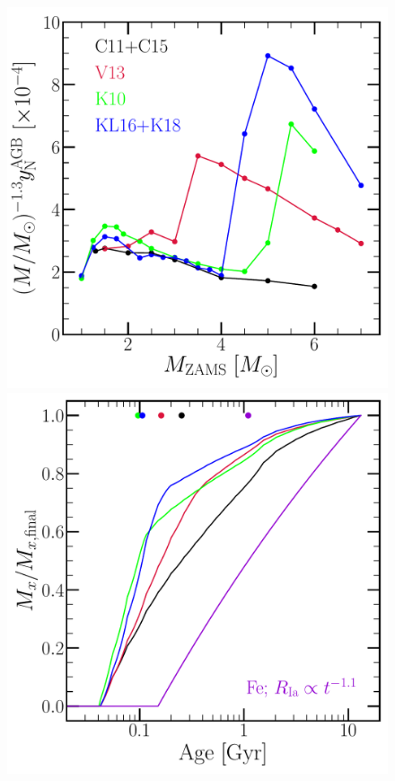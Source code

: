\documentclass[ms.tex]{subfiles}
\begin{document}
\begin{figure} 
\centering 
\includegraphics[scale = 0.3]{agb_yield_models_imfweighted.pdf} 
\includegraphics[scale = 0.3]{ssp_production_modelcomp.pdf} 

\end{figure}
\end{document}
